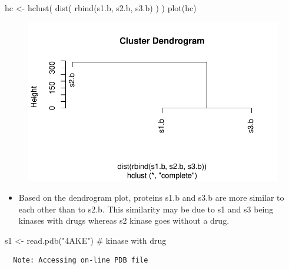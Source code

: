 \documentclass[
  letterpaper,
  DIV=11,
  numbers=noendperiod]{scrartcl}
\newenvironment{Shaded}{\begin{snugshade}}{\end{snugshade}}
\newcommand{\CommentTok}[1]{\textcolor[rgb]{0.37,0.37,0.37}{#1}}
\newcommand{\FunctionTok}[1]{\textcolor[rgb]{0.28,0.35,0.67}{#1}}
\newcommand{\NormalTok}[1]{\textcolor[rgb]{0.00,0.23,0.31}{#1}}
\newcommand{\OtherTok}[1]{\textcolor[rgb]{0.00,0.23,0.31}{#1}}
\newcommand{\StringTok}[1]{\textcolor[rgb]{0.13,0.47,0.30}{#1}}
\providecommand{\tightlist}{%
  \setlength{\itemsep}{0pt}\setlength{\parskip}{0pt}}\usepackage{longtable,booktabs,array}
\begin{document}
\begin{Shaded}
\begin{Highlighting}[]
\NormalTok{hc }\OtherTok{\textless{}{-}} \FunctionTok{hclust}\NormalTok{( }\FunctionTok{dist}\NormalTok{( }\FunctionTok{rbind}\NormalTok{(s1.b, s2.b, s3.b) ) )}
\FunctionTok{plot}\NormalTok{(hc)}
\end{Highlighting}
\end{Shaded}

\begin{figure}[H]

{\centering \includegraphics{hw6_turnin_files/figure-pdf/unnamed-chunk-4-1.pdf}

}

\end{figure}

\begin{itemize}
\tightlist
\item
  Based on the dendrogram plot, proteins s1.b and s3.b are more similar
  to each other than to s2.b. This similarity may be due to s1 and s3
  being kinases with drugs whereas s2 kinase goes without a drug.
\end{itemize}

\begin{Shaded}
\begin{Highlighting}[]
\NormalTok{s1 }\OtherTok{\textless{}{-}} \FunctionTok{read.pdb}\NormalTok{(}\StringTok{"4AKE"}\NormalTok{) }\CommentTok{\# kinase with drug}
\end{Highlighting}
\end{Shaded}

\begin{verbatim}
  Note: Accessing on-line PDB file
\end{verbatim}
\end{document}
